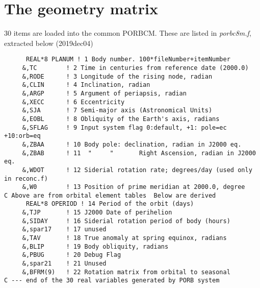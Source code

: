\documentclass{article}
\newcommand{\nf}{\textit}  %
\begin{document}
\section{The geometry matrix \label{geomm}} %
30 items are loaded into the common PORBCM. These are listed in \nf{porbc8m.f}, extracted below (2019dec04)
\vspace{-3.mm}
\begin{verbatim}
      REAL*8 PLANUM ! 1 Body number. 100*fileNumber+itemNumber
     &,TC        ! 2 Time in centuries from reference date (2000.0)
     &,RODE      ! 3 Longitude of the rising node, radian
     &,CLIN      ! 4 Inclination, radian
     &,ARGP      ! 5 Argument of periapsis, radian
     &,XECC      ! 6 Eccentricity
     &,SJA       ! 7 Semi-major axis (Astronomical Units)
     &,EOBL      ! 8 Obliquity of the Earth's axis, radians
     &,SFLAG     ! 9 Input system flag 0:default, +1: pole=ec +10:orb=eq
     &,ZBAA      ! 10 Body pole: declination, radian in J2000 eq.
     &,ZBAB      ! 11  "     "       Right Ascension, radian in J2000 eq.
     &,WDOT      ! 12 Siderial rotation rate; degrees/day (used only in reconc.f) 
     &,W0        ! 13 Position of prime meridian at 2000.0, degree
C Above are from orbital element tables  Below are derived    
      REAL*8 OPERIOD ! 14 Period of the orbit (days)
     &,TJP       ! 15 J2000 Date of perihelion
     &,SIDAY     ! 16 Siderial rotation period of body (hours)
     &,spar17    ! 17 unused
     &,TAV       ! 18 True anomaly at spring equinox, radians
     &,BLIP      ! 19 Body obliquity, radians
     &,PBUG      ! 20 Debug Flag   
     &,spar21    ! 21 Unused    
     &,BFRM(9)   ! 22 Rotation matrix from orbital to seasonal
C --- end of the 30 real variables generated by PORB system
\end{verbatim}
\newpage
\end{document}
